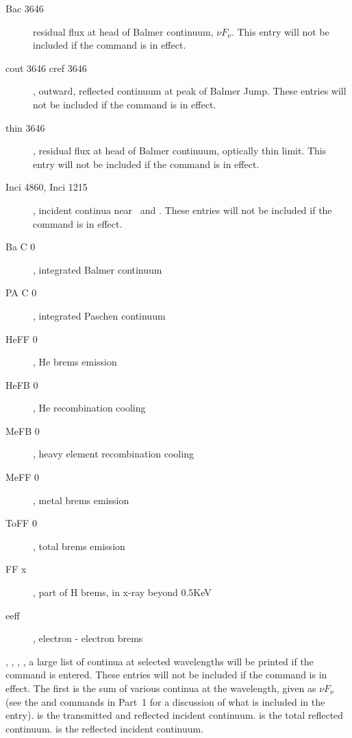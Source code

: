 \begin{description}
\item[Bac  3646]  residual flux at head of Balmer
continuum, $\nu F_\nu$. This entry will not be included if the 
command is in effect.

\item[cout 3646 cref 3646], outward, reflected continuum at peak of Balmer Jump.
These entries will not be included if the  command is in effect.

\item[thin 3646], residual flux at head of Balmer continuum, optically thin limit.
This entry will not be included if the  command is in effect.

\item[Inci 4860, Inci 1215], incident continua near \ha\ and \la.
These entries will not be included if the  command is in effect.

\item[Ba C    0], integrated Balmer continuum

\item[PA C    0], integrated Paschen continuum

\item[HeFF    0], He brems emission

\item[HeFB    0], He recombination cooling

\item[MeFB    0], heavy element recombination cooling

\item[MeFF    0], metal brems emission

\item[ToFF    0], total brems emission

\item[FF x], part of H brems, in x-ray beyond 0.5KeV

\item[eeff], electron - electron brems
\end{description}

,
,
,
,
a large list of continua
at selected wavelengths will be printed if the
command is entered.
These entries will not be included if the  command is in effect.
The first is the sum of various continua at the wavelength,
given as $\nu F_\nu$ (see the  and  commands
in Part~1 for a discussion of what is included in the  entry).
 is the transmitted and reflected incident continuum.
 is the total reflected continuum.
 is the reflected incident
continuum.

